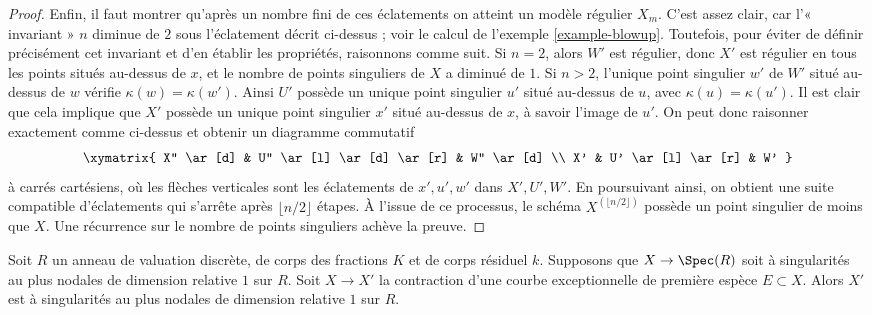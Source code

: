 \begin{proof}
\medskip\noindent
Enfin, il faut montrer qu'après un nombre fini de ces éclatements on atteint
un modèle régulier $X_m$. C'est assez clair, car l'« invariant » $n$
diminue de $2$ sous l'éclatement décrit ci-dessus ; voir le calcul de
l'exemple \ref{example-blowup}. Toutefois, pour éviter de définir
précisément cet invariant et d'en établir les propriétés, raisonnons comme
suit. Si $n=2$, alors $W'$ est régulier, donc $X'$ est régulier en tous les
points situés au-dessus de $x$, et le nombre de points singuliers de $X$ a
diminué de $1$. Si $n>2$, l'unique point singulier $w'$ de $W'$ situé
au-dessus de $w$ vérifie $\kappa(w)=\kappa(w')$. Ainsi $U'$ possède un
unique point singulier $u'$ situé au-dessus de $u$, avec
$\kappa(u)=\kappa(u')$. Il est clair que cela implique que $X'$ possède un
unique point singulier $x'$ situé au-dessus de $x$, à savoir l'image de
$u'$. On peut donc raisonner exactement comme ci-dessus et obtenir un
diagramme commutatif
$$
\xymatrix{
X'' \ar[d] &
U'' \ar[l] \ar[d] \ar[r] &
W'' \ar[d] \\
X' & U' \ar[l] \ar[r] & W'
}
$$
à carrés cartésiens, où les flèches verticales sont les éclatements de
$x',u',w'$ dans $X',U',W'$. En poursuivant ainsi, on obtient une suite
compatible d'éclatements qui s'arrête après $\lfloor n/2\rfloor$ étapes.
À l'issue de ce processus, le schéma
$X^{(\lfloor n/2\rfloor)}$ possède un point singulier de moins que $X$.
Une récurrence sur le nombre de points singuliers achève la preuve.
\end{proof}

\begin{lemma}
\label{lemma-blowdown-at-worst-nodal}
Soit $R$ un anneau de valuation discrète, de corps des fractions $K$ et de
corps résiduel $k$. Supposons que $X\to\Spec(R)$ soit à singularités au
plus nodales de dimension relative $1$ sur $R$. Soit $X\to X'$ la
contraction d'une courbe exceptionnelle de première espèce $E\subset X$.
Alors $X'$ est à singularités au plus nodales de dimension relative $1$
sur $R$.
\end{lemma}

